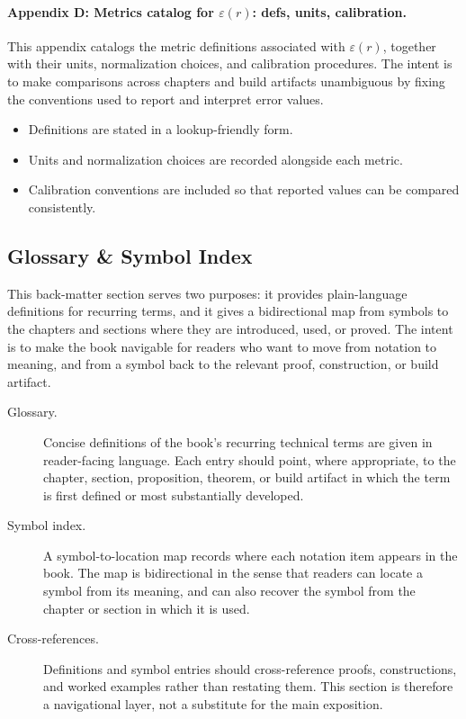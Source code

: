 \documentclass[11pt]{article}
\begin{document}
\paragraph{Appendix D: Metrics catalog for $\varepsilon(r)$: defs, units, calibration.} This appendix catalogs the metric definitions associated with $\varepsilon(r)$, together with their units, normalization choices, and calibration procedures. The intent is to make comparisons across chapters and build artifacts unambiguous by fixing the conventions used to report and interpret error values.

\begin{itemize}
  \item Definitions are stated in a lookup-friendly form.
  \item Units and normalization choices are recorded alongside each metric.
  \item Calibration conventions are included so that reported values can be compared consistently.
\end{itemize}


\subsection{Glossary \& Symbol Index}

This back-matter section serves two purposes: it provides plain-language definitions for recurring terms, and it gives a bidirectional map from symbols to the chapters and sections where they are introduced, used, or proved. The intent is to make the book navigable for readers who want to move from notation to meaning, and from a symbol back to the relevant proof, construction, or build artifact.

\begin{description}
  \item[Glossary.] Concise definitions of the book's recurring technical terms are given in reader-facing language. Each entry should point, where appropriate, to the chapter, section, proposition, theorem, or build artifact in which the term is first defined or most substantially developed.
  \item[Symbol index.] A symbol-to-location map records where each notation item appears in the book. The map is bidirectional in the sense that readers can locate a symbol from its meaning, and can also recover the symbol from the chapter or section in which it is used.
  \item[Cross-references.] Definitions and symbol entries should cross-reference proofs, constructions, and worked examples rather than restating them. This section is therefore a navigational layer, not a substitute for the main exposition.
\end{description}
\end{document}
